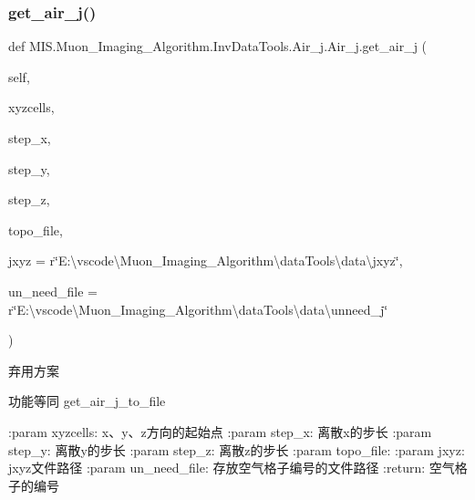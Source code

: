 \subsubsection{\texorpdfstring{get\+\_\+air\+\_\+j()}{get\_air\_j()}}
{\footnotesize\ttfamily def M\+I\+S.\+Muon\+\_\+\+Imaging\+\_\+\+Algorithm.\+Inv\+Data\+Tools.\+Air\+\_\+j.\+Air\+\_\+j.\+get\+\_\+air\+\_\+j (\begin{DoxyParamCaption}\item[{}]{self,  }\item[{}]{xyzcells,  }\item[{}]{step\+\_\+x,  }\item[{}]{step\+\_\+y,  }\item[{}]{step\+\_\+z,  }\item[{}]{topo\+\_\+file,  }\item[{}]{jxyz = {\ttfamily r\char`\"{}E\+:\textbackslash{}vscode\textbackslash{}Muon\+\_\+Imaging\+\_\+Algorithm\textbackslash{}dataTools\textbackslash{}data\textbackslash{}jxyz\char`\"{}},  }\item[{}]{un\+\_\+need\+\_\+file = {\ttfamily r\char`\"{}E\+:\textbackslash{}vscode\textbackslash{}Muon\+\_\+Imaging\+\_\+Algorithm\textbackslash{}dataTools\textbackslash{}data\textbackslash{}unneed\+\_\+j\char`\"{}} }\end{DoxyParamCaption})}

\begin{DoxyVerb}弃用方案

功能等同 get_air_j_to_file

:param xyzcells: x、y、z方向的起始点
:param step_x: 离散x的步长
:param step_y: 离散y的步长
:param step_z: 离散z的步长
:param topo_file:
:param jxyz: jxyz文件路径
:param un_need_file: 存放空气格子编号的文件路径
:return: 空气格子的编号
\end{DoxyVerb}
 \mbox{\label{classMIS_1_1Muon__Imaging__Algorithm_1_1InvDataTools_1_1Air__j_1_1Air__j_a93b1afae65366af68f04d6a48dbc17dd}} 
